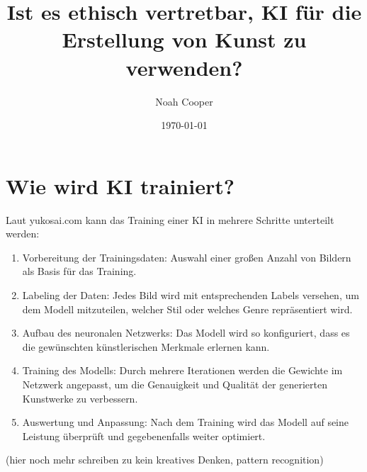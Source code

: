 \documentclass{article}
\title{Ist es ethisch vertretbar, KI für die Erstellung von Kunst zu verwenden?}
\author{Noah Cooper}
\date{\today}
\begin{document}
\maketitle


\tableofcontents



\section{Wie wird KI trainiert?}
    Laut yukosai.com kann das Training einer KI in mehrere Schritte unterteilt werden:
    \begin{enumerate}
        \item Vorbereitung der Trainingsdaten: Auswahl einer großen Anzahl von Bildern als Basis für das Training.
        \item Labeling der Daten: Jedes Bild wird mit entsprechenden Labels versehen, um dem Modell mitzuteilen, welcher Stil oder welches Genre repräsentiert wird.
        \item Aufbau des neuronalen Netzwerks: Das Modell wird so konfiguriert, dass es die gewünschten künstlerischen Merkmale erlernen kann.
        \item Training des Modells: Durch mehrere Iterationen werden die Gewichte im Netzwerk angepasst, um die Genauigkeit und Qualität der generierten Kunstwerke zu verbessern.
        \item Auswertung und Anpassung: Nach dem Training wird das Modell auf seine Leistung überprüft und gegebenenfalls weiter optimiert.
    \end{enumerate}
    (hier noch mehr schreiben zu kein kreatives Denken, pattern recognition)
    
\end{document}

